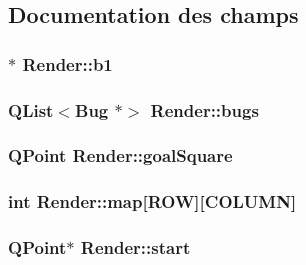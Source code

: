 \subsection{Documentation des champs}
\hypertarget{classRender_ac6b86ad92172fefa5b9a56b31e9055d3}{
\subsubsection[{b1}]{$\ast$ {\bf Render::b1}}}
\label{classRender_ac6b86ad92172fefa5b9a56b31e9055d3}
\hypertarget{classRender_a3d5b29479d129b61c6ad8f3eec2f1f76}{
\subsubsection[{bugs}]{\setlength{\rightskip}{0pt plus 5cm}QList$<${\bf Bug} $\ast$$>$ {\bf Render::bugs}}}
\label{classRender_a3d5b29479d129b61c6ad8f3eec2f1f76}
\hypertarget{classRender_a08247005a2c595988f8a0ab14a8b1ad9}{
\subsubsection[{goalSquare}]{\setlength{\rightskip}{0pt plus 5cm}QPoint {\bf Render::goalSquare}}}
\label{classRender_a08247005a2c595988f8a0ab14a8b1ad9}
\hypertarget{classRender_a9c7793879c5007b8cae3a9c2885d283f}{
\subsubsection[{map}]{\setlength{\rightskip}{0pt plus 5cm}int {\bf Render::map}\mbox{[}ROW\mbox{]}\mbox{[}COLUMN\mbox{]}}}
\label{classRender_a9c7793879c5007b8cae3a9c2885d283f}
\hypertarget{classRender_afa2c3b6d106bf91639ddf351d7d3315e}{
\subsubsection[{start}]{\setlength{\rightskip}{0pt plus 5cm}QPoint$\ast$ {\bf Render::start}}}
